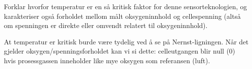 Forklar hvorfor temperatur er en så kritisk faktor for denne sensorteknologien, og karakteriser også forholdet mellom målt oksygeninnhold og cellespenning (altså om spenningen er direkte eller omvendt relatert til oksygeninnhold).







At temperatur er kritisk burde være tydelig ved å se på Nernst-ligningen. Når det gjelder oksygen/spenningsforholdet kan vi si dette: celleutgangen blir null (0) hvis prosessgassen inneholder like mye oksygen som referansen (luft).









